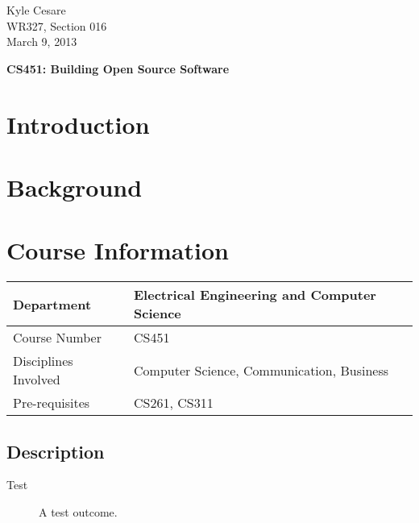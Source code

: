 \documentclass[12pt,letterpaper]{article}
\begin{document}
\begin{flushleft}
  Kyle Cesare \\
  WR327, Section 016\\
  March 9, 2013
\end{flushleft}

\thispagestyle{empty}

\begin{center}
  \Large \textbf{CS451: Building Open Source Software}
\end{center}

\section*{Introduction}

\section*{Background}

\section*{Course Information}

\begin{tabular}{ | l | l | }
  \hline
  Department           & Electrical Engineering and Computer Science \\ \hline
  Course Number        & CS451 \\ \hline
  Disciplines Involved & Computer Science, Communication, Business \\ \hline
  Pre-requisites       & CS261, CS311 \\ \hline
\end{tabular}

\subsection*{Description}
\begin{description}
  \item[Test] A test outcome.
\end{description}
\end{document}
